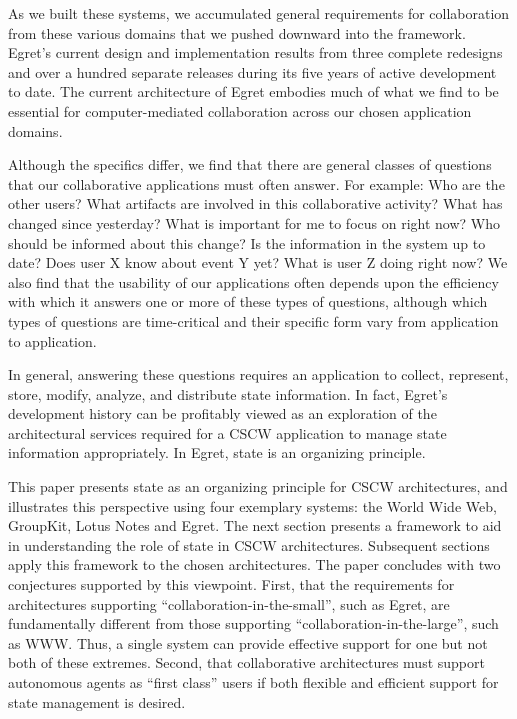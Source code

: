 As we built these systems, we accumulated general requirements for
collaboration from these various domains that we pushed downward into the
framework.  Egret's current design and implementation results from three
complete redesigns and over a hundred separate releases during its five
years of active development to date.  The current architecture of Egret
embodies much of what we find to be essential for computer-mediated
collaboration across our chosen application domains.

Although the specifics differ, we find that there are general classes of
questions that our collaborative applications must often answer.  For
example: Who are the other users?  What artifacts are involved in this
collaborative activity?  What has changed since yesterday?  What is
important for me to focus on right now?  Who should be informed about this
change?  Is the information in the system up to date?  Does user X know
about event Y yet? What is user Z doing right now?  We also find that the
usability of our applications often depends upon the efficiency with which
it answers one or more of these types of questions, although which types of
questions are time-critical and their specific form vary from application
to application.


In general, answering these questions requires an application to collect,
represent, store, modify, analyze, and distribute state information.  In
fact, Egret's development history can be profitably viewed as an
exploration of the architectural services required for a CSCW application
to manage state information appropriately.  In Egret, state is an
organizing principle.

This paper presents state as an organizing principle for CSCW
architectures, and illustrates this perspective using four exemplary
systems: the World Wide Web, GroupKit, Lotus Notes and Egret.  The next
section presents a framework to aid in understanding the role of state in
CSCW architectures.  Subsequent sections apply this framework to the chosen
architectures. The paper concludes with two conjectures supported
by this viewpoint.  First, that the requirements for architectures
supporting ``collaboration-in-the-small'', such as Egret, are fundamentally
different from those supporting ``collaboration-in-the-large'', such as
WWW. Thus, a single system can provide effective support for one but not
both of these extremes.  Second, that collaborative architectures must
support autonomous agents as ``first class'' users if both flexible and
efficient support for state management is desired.


